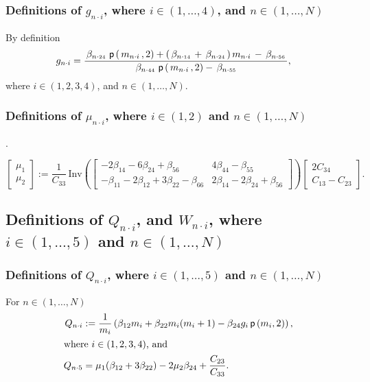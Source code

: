 \documentclass[preprint,12pt,times,draft]{elsarticle}
\numberwithin{equation}{section}
\newcommand{\pr}[1]{\left( #1 \right)}
\newcommand{\p}{\,\mathsf{p}}
\newcommand{\Inv}{\,\mathrm{Inv}}
\newcommand{\msub}[2]{
\IfEqCase{#2}{
      {i}{\, m_{#1\cdot #2}\,}%
  }[\,m_{#1\cdot {\scriptscriptstyle #2}}\,]}
\newcommand{\gsub}[2]{g_{#1\cdot #2}}
\newcommand{\Qsub}[2]{Q_{#1\cdot #2}}
\newcommand{\musub}[2]{\mu_{#1\cdot #2}}
\newcommand{\betasub}[2]{
\IfEqCase{#2}{
       {xxxx}{\,\beta_{ {#1}\cdot { #2}}\,}%
   }[\,\beta_{ {#1}\cdot {\scriptscriptstyle #2}}\,]}
\newcommand{\infour}{\in(1,\ldots,4)}
\newcommand{\inN}{\in(1,\ldots,N)}
\renewcommand{\>}{$\Rightarrow$}
\begin{document}
\subsubsection{Definitions of $\gsub{n}{i}$, where $i\infour$, and $n\inN$}
\label{sec:gni}

By definition
\begin{subequations}
	\begin{align}
	\gsub{n}{i} & = \frac{\betasub{n}{24}\p\pr{\msub{n}{i},2}+(\betasub{n}{14} + \betasub{n}{24})\msub{n}{i} - \betasub{n}{56}}{\betasub{n}{44}\p\pr{\msub{n}{i},2} - \betasub{n}{55}},
	\end{align}
\end{subequations}
where $i\in (1,2,3,4)$, and $n\in(1,\ldots,N)$.

\subsubsection{Definitions of $\musub{n}{i}$, where $i\in (1,2)$ and $n\in (1,\ldots,N)$}.
\label{sec:muni}

	\begin{equation}
	\begin{bmatrix}
		\mu_1 \\ \mu_2
	\end{bmatrix} :=
	\frac{1}{C_{33}}
	\Inv \pr{\begin{bmatrix}
		-2\beta_{14}-6\beta_{24}+\beta_{56} & 4\beta_{44}-\beta_{55} \\
		-\beta_{11}-2\beta_{12}+3\beta_{22}-\beta_{66} & 2\beta_{14}-2\beta_{24}+\beta_{56}
	\end{bmatrix}}
	\begin{bmatrix}
			2C_{34} \\ C_{13}-C_{23}
	\end{bmatrix}.
	\end{equation}


\subsection{Definitions of $\Qsub{n}{i}$, and $W_{n\cdot i}$, where $i\in (1,\ldots,5)$ and $n\in (1,\ldots,N)$}
\label{sec:Qni}

\subsubsection{Definitions of $\Qsub{n}{i}$, where $i\in (1,\ldots,5)$ and $n\in (1,\ldots,N)$}

For $n\in(1,\ldots,N)$
\begin{subequations}
\begin{align}
  \Qsub{n}{i}& := \frac{1}{m_i} \pr{\beta_{12}m_i + \beta_{22}m_i(m_i+1) - \beta_{24} g_i \p\pr{m_i,2}}, \\
\intertext{where $i\in (1,2,3,4)$, and}
\Qsub{n}{5} & = \mu_1(\beta_{12} + 3\beta_{22})-2\mu_2\beta_{24} + \frac{C_{23}}{C_{33}}.
\end{align}
\end{subequations}
\end{document}
